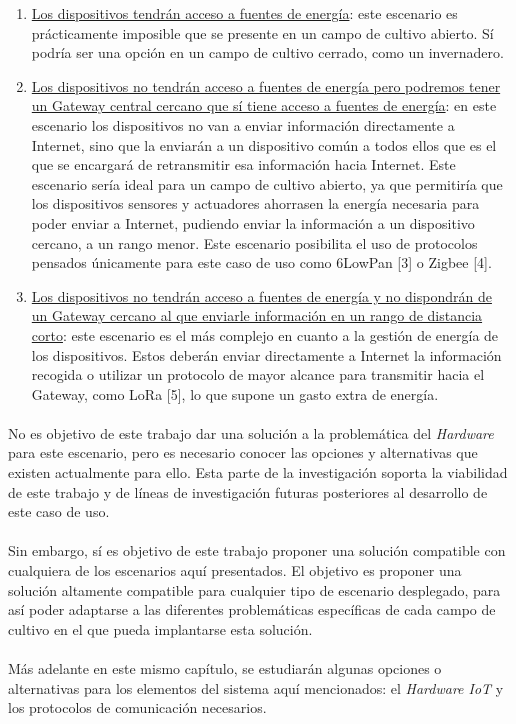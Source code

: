 \documentclass[../../memoria.tex]{subfiles}
\begin{document}
\begin{enumerate}
    \item \uline{Los dispositivos tendrán acceso a fuentes de energía}: este escenario es prácticamente imposible que se presente en un campo de cultivo abierto. Sí podría ser una opción en un campo de cultivo cerrado, como un invernadero.

    \item \uline{Los dispositivos no tendrán acceso a fuentes de energía pero podremos tener un Gateway central cercano que sí tiene acceso a fuentes de energía}: en este escenario los dispositivos no van a enviar información directamente a Internet, sino que la enviarán a un dispositivo común a todos ellos que es el que se encargará de retransmitir esa información hacia Internet. Este escenario sería ideal para un campo de cultivo abierto, ya que permitiría que los dispositivos sensores y actuadores ahorrasen la energía necesaria para poder enviar a Internet, pudiendo enviar la información a un dispositivo cercano, a un rango menor. Este escenario posibilita el uso de protocolos pensados únicamente para este caso de uso como 6LowPan [3] o Zigbee [4].
    \item \uline{Los dispositivos no tendrán acceso a fuentes de energía y no dispondrán de un Gateway cercano al que enviarle información en un rango de distancia corto}: este escenario es el más complejo en cuanto a la gestión de energía de los dispositivos. Estos deberán enviar directamente a Internet la información recogida o utilizar un protocolo de mayor alcance para transmitir hacia el Gateway, como LoRa [5], lo que supone un gasto extra de energía.
\end{enumerate}

\paragraph{}
No es objetivo de este trabajo dar una solución a la problemática del \textit{Hardware} para este escenario, pero es necesario conocer las opciones y alternativas que existen actualmente para ello. Esta parte de la investigación soporta la viabilidad de este trabajo y de líneas de investigación futuras posteriores al desarrollo de este caso de uso.

\paragraph{}
Sin embargo, sí es objetivo de este trabajo proponer una solución compatible con cualquiera de los escenarios aquí presentados. El objetivo es proponer una solución altamente compatible para cualquier tipo de escenario desplegado, para así poder adaptarse a las diferentes problemáticas específicas de cada campo de cultivo en el que pueda implantarse esta solución.

\paragraph{}
Más adelante en este mismo capítulo, se estudiarán algunas opciones o alternativas para los elementos del sistema aquí mencionados: el \textit{Hardware IoT} y los protocolos de comunicación necesarios.
\end{document}
